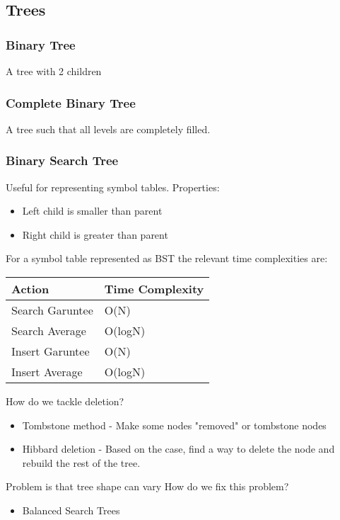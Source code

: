 \documentclass[11pt]{article}
\begin{document}
\subsection*{Trees}
\label{sec:orga08ca38}
\subsubsection*{Binary Tree}
\label{sec:orgb57e5eb}
A tree with 2 children
\subsubsection*{Complete Binary Tree}
\label{sec:org098d583}
A tree such that all levels are completely filled.
\subsubsection*{Binary Search Tree}
\label{sec:org017f619}
Useful for representing symbol tables.
Properties:
\begin{itemize}
\item Left child is smaller than parent
\item Right child is greater than parent
\end{itemize}

For a symbol table represented as BST the relevant time complexities are:
\begin{center}
\begin{tabular}{ll}
Action & Time Complexity\\
\hline
Search Garuntee & O(N)\\
Search Average & O(logN)\\
Insert Garuntee & O(N)\\
Insert Average & O(logN)\\
\end{tabular}
\end{center}


How do we tackle deletion?
\begin{itemize}
\item Tombstone method - Make some nodes "removed" or tombstone nodes
\item Hibbard deletion - Based on the case, find a way to delete the node and rebuild the rest of the tree.
\end{itemize}

Problem is that tree shape can vary
How do we fix this problem?
\begin{itemize}
\item Balanced Search Trees
\end{itemize}
\end{document}
